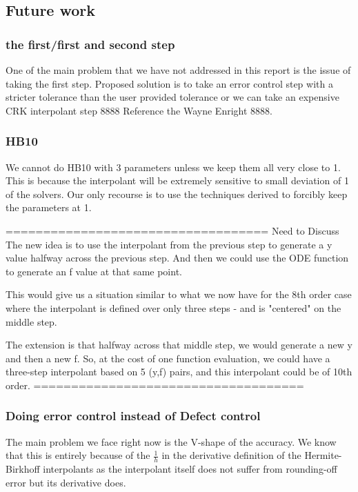 \documentclass{article}
\begin{document}
\subsection{Future work}
\label{section:HB_future_work}
\subsubsection{the first/first and second step}
One of the main problem that we have not addressed in this report is the issue of taking the first step. Proposed solution is to  take an error control step with a stricter tolerance than the user provided tolerance or we can take an expensive CRK interpolant step 8888 Reference the Wayne Enright 8888.

\subsubsection{HB10}
We cannot do HB10 with 3 parameters unless we keep them all very close to 1. This is because the interpolant will be extremely sensitive to small deviation of 1 of the solvers.
Our only recourse is to use the techniques derived to forcibly keep the parameters at 1. 

===================================
Need to Discuss
The new idea is to use the interpolant from the previous step to generate
a y value halfway across the previous step. And then we could
use the ODE function to generate an f value at that same point.

This would give us a situation similar to what we now have for the
8th order case where the interpolant is defined over only three
steps - and is "centered" on the middle step.

The extension is that halfway across that middle step, we would
generate a new y and then a new f. So, at the cost of one
function evaluation, we could have a three-step interpolant
based on 5 (y,f)  pairs, and this interpolant could be of 10th order.
====================================

\subsubsection{Doing error control instead of Defect control}
The main problem we face right now is the V-shape of the accuracy. We know that this is entirely because of the $\frac{1}{h}$ in the derivative definition of the Hermite-Birkhoff interpolants as the interpolant itself does not suffer from rounding-off error but its derivative does.
\end{document}
